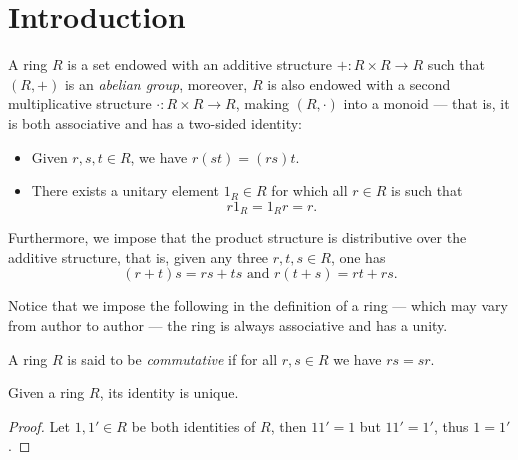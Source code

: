 \section{Introduction}

%
\begin{definition}[Ring]
    \label{def:ring}
    A ring \(R\) is a set endowed with an additive structure \(+: R \times R \to R\)
    such that \((R, +)\) is an \emph{abelian group}, moreover, \(R\) is also endowed
    with a second multiplicative structure \(\cdot: R \times R \to R\), making
    \((R, \cdot)\) into a monoid --- that is, it is both associative and has a
    two-sided identity:
    \begin{itemize}\setlength\itemsep{0em}
        \item Given \(r, s, t \in R\), we have \(r (s t) = (r s) t\).

        \item There exists a unitary element \(1_R \in R\) for which all \(r \in R\) is
              such that
              \[
                  r 1_R = 1_R r = r.
              \]
    \end{itemize}
    Furthermore, we impose that the product structure is distributive over the
    additive structure, that is, given any three \(r, t, s \in R\), one has
    \[
        (r + t) s = r s + t s \text{ and } r (t + s) = r t + r s.
    \]
\end{definition}
%

%
\begin{remark}
    \label{rem:def-ring}
    Notice that we impose the following in the definition of a ring --- which may
    vary from author to author --- the ring is always associative and has a unity.
\end{remark}
%

%
\begin{definition}
    \label{def:commutative-ring}
    A ring \(R\) is said to be \emph{commutative} if for all \(r, s \in R\) we have
    \(r s = s r\).
\end{definition}
%

%
\begin{corollary}
    \label{cor:ring-unique-identity}
    Given a ring \(R\), its identity is unique.
\end{corollary}
%

%
\begin{proof}
    Let \(1, 1' \in R\) be both identities of \(R\), then \(1 1' = 1\) but \(1 1' =
    1'\), thus \(1 = 1'\).
\end{proof}
%

